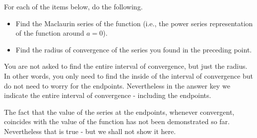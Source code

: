 For each of the items below, do the following.
\begin{itemize}
\item Find the Maclaurin series of the function (i.e., the power series representation of the function around $a=0$).
\item Find the radius of convergence of the series you found in the preceding point. 
\end{itemize}
You are not asked to find the entire interval of convergence, but just the radius. In other words, you only need to find the inside of the interval of convergence but do not need to worry for the endpoints. Nevertheless in the answer key we indicate the entire interval of convergence - including the endpoints. 

The fact that the value of the series at the endpoints, whenever convergent, coincides with the value of the function has not been demonstrated so far. Nevertheless that is true - but we shall not show it here.

